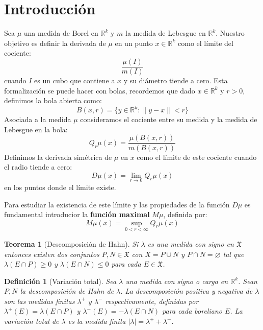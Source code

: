 \documentclass[12pt,a4paper]{article}
\theoremstyle{profesional}
\newtheorem{teorema}{Teorema}[section]
\theoremstyle{definicion-style}
\newtheorem{definicion}{Definición}[section]
\newcommand{\R}{\mathbb{R}}
\begin{document}
\vspace*{\fill}

\newpage

\tableofcontents
\thispagestyle{empty}
\newpage

\section{Introducción}

Sea \( \mu \) una medida de Borel en \( \R^k \) y \( m \) la medida de Lebesgue en \( \R^k \).
Nuestro objetivo es definir la derivada de \( \mu \) en un punto \( x \in \R^k \) como el límite del cociente:
\[
    \frac{\mu(I)}{m(I)}
\]
cuando \( I \) es un cubo que contiene a \( x \) y su diámetro tiende a cero. Esta formalización se puede hacer con bolas,
recordemos que dado \( x \in \R^k \) y \( r > 0 \), definimos la bola abierta como: \[
    B(x, r) = \{ y \in \R^k : \| y - x \| < r \}
\]
Asociada a la medida \( \mu \) consideramos el cociente entre su medida y la medida de Lebesgue en la bola: \[
    Q_r \mu (x) = \frac{\mu(B(x, r))}{m(B(x, r))}
\]
Definimos la derivada simétrica de \( \mu \) en \( x \) como el límite de este cociente cuando el radio tiende a cero: \[
    D \mu (x) = \lim_{r \to 0} Q_r \mu (x)
\]
en los puntos donde el límite existe.

Para estudiar la existencia de este límite y las propiedades de la función \( D \mu \) es fundamental introducior la \textbf{función maximal} \( M \mu \), definida por: \[
    M \mu (x) = \sup_{0 < r < \infty} Q_r \mu (x)
\]

\begin{teorema}[Descomposición de Hahn]
    Si \( \lambda \) es una medida con signo en \( \mathfrak{X} \) entonces existen dos conjuntos \( P, N \in \mathfrak{X} \) con \( X = P \cup N \) y
    \( P \cap N = \varnothing \) tal que \( \lambda(E \cap P) \geq 0 \) y \( \lambda(E \cap N) \leq 0 \) para cada \( E \in \mathfrak{X} \).
\end{teorema}

\begin{definicion}[Variación total]
    Sea \( \lambda \) una medida con signo o carga en \( \R^k \). Sean \( P, N \) la descomposición de Hahn de \( \lambda \). La descomposición positiva y negativa de \( \lambda \) son las medidas finitas \( \lambda^+ \) y \( \lambda^- \) respectivamente, definidas por \( \lambda^+(E) = \lambda(E \cap P) \) y \( \lambda^-(E) = -\lambda(E \cap N) \) para cada boreliano \( E \). La variación total de \( \lambda \) es la medida finita \( |\lambda| = \lambda^+ + \lambda^- \).
\end{definicion}
\end{document}
